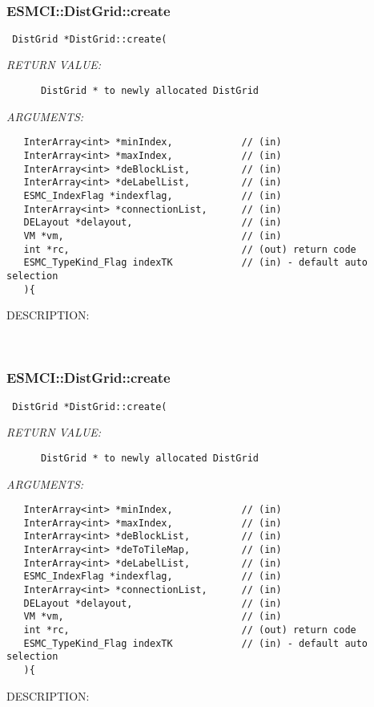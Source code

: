    
 
\mbox{}\hrulefill\
 
\subsubsection [ESMCI::DistGrid::create] {ESMCI::DistGrid::create}


  
\begin{verbatim} DistGrid *DistGrid::create(\end{verbatim}{\em RETURN VALUE:}
\begin{verbatim}      DistGrid * to newly allocated DistGrid\end{verbatim}{\em ARGUMENTS:}
\begin{verbatim}   InterArray<int> *minIndex,            // (in)
   InterArray<int> *maxIndex,            // (in)
   InterArray<int> *deBlockList,         // (in)
   InterArray<int> *deLabelList,         // (in)
   ESMC_IndexFlag *indexflag,            // (in)
   InterArray<int> *connectionList,      // (in)
   DELayout *delayout,                   // (in)
   VM *vm,                               // (in)
   int *rc,                              // (out) return code
   ESMC_TypeKind_Flag indexTK            // (in) - default auto selection
   ){\end{verbatim}
{\sf DESCRIPTION:\\ }


   
 
\mbox{}\hrulefill\
 
\subsubsection [ESMCI::DistGrid::create] {ESMCI::DistGrid::create}


  
\begin{verbatim} DistGrid *DistGrid::create(\end{verbatim}{\em RETURN VALUE:}
\begin{verbatim}      DistGrid * to newly allocated DistGrid\end{verbatim}{\em ARGUMENTS:}
\begin{verbatim}   InterArray<int> *minIndex,            // (in)
   InterArray<int> *maxIndex,            // (in)
   InterArray<int> *deBlockList,         // (in)
   InterArray<int> *deToTileMap,         // (in)
   InterArray<int> *deLabelList,         // (in)
   ESMC_IndexFlag *indexflag,            // (in)
   InterArray<int> *connectionList,      // (in)
   DELayout *delayout,                   // (in)
   VM *vm,                               // (in)
   int *rc,                              // (out) return code
   ESMC_TypeKind_Flag indexTK            // (in) - default auto selection
   ){\end{verbatim}
{\sf DESCRIPTION:\\ }


